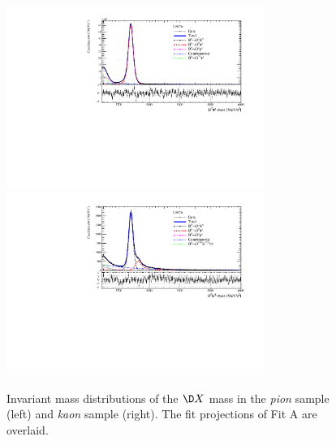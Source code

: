 \begin{figure}[tbp]
    \centering
    \includegraphics[width=0.75\textwidth]{07MassFit/figs/MDFit_BeautyMass_Bd2DPi_withPulls.pdf}
    \includegraphics[width=0.75\textwidth]{07MassFit/figs/MDFit_BeautyMass_Bd2DK_withPulls.pdf}
    \caption{Invariant mass distributions of the $\D X$ mass in the \emph{pion} sample (left) and \emph{kaon} sample (right).
    The fit projections of Fit A are overlaid.}
    \label{fig:MassFitPlot}
\end{figure}

